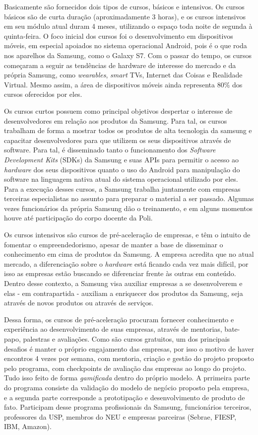 Basicamente são fornecidos dois tipos de cursos, básicos e intensivos. Os cursos básicos são de curta duração (aproximadamente 3 horas), e os cursos intensivos em seu módulo atual duram 4 meses, utilizando o espaço toda noite de segunda à quinta-feira. O foco inicial dos cursos foi o desenvolvimento em dispositivos móveis, em especial apoiados no sistema operacional Android, pois é o que roda nos aparelhos da Samsung, como o Galaxy S7. Com o passar do tempo, os cursos começaram a seguir as tendências de hardware de interesse do mercado e da própria Samsung, como \textit{wearables}, \textit{smart} TVs, Internet das Coisas e Realidade Virtual. Mesmo assim, a área de dispositivos móveis ainda representa 80\% dos cursos oferecidos por eles.

Os cursos curtos possuem como principal objetivos despertar o interesse de desenvolvedores em relação aos produtos da Samsung. Para tal, os cursos trabalham de forma a mostrar todos os produtos de alta tecnologia da samsung e capacitar desenvolvedores para que utilizem os seus dispositivos através de software. Para tal, é disseminado tanto o funcionamento dos \textit{Software Development Kits} (SDKs) da Samsung e suas APIs para permitir o acesso ao \textit{hardware} dos seus dispositivos quanto o uso do Android para manipulação do software na linguagem nativa atual do sistema operacional utilizado por eles. Para a execução desses cursos, a Samsung trabalha juntamente com empresas terceiras especialistas no assunto para preparar o material a ser passado. Algumas vezes funcionários da própria Samsung dão o treinamento, e em alguns momentos houve até participação do corpo docente da Poli.

Os cursos intensivos são cursos de pré-aceleração de empresas, e têm o intuito de fomentar o empreendedorismo, apesar de manter a base de disseminar o conhecimento em cima de produtos da Samsung. A empresa acredita que no atual mercado, a diferenciação sobre o \textit{hardware} está ficando cada vez mais difícil, por isso as empresas estão buscando se diferenciar frente às outras em conteúdo. Dentro desse contexto, a Samsung visa auxiliar empresas a se desenvolverem e elas - em contrapartida - auxiliam a enriquecer dos produtos da Samsung, seja através de novos produtos ou através de serviços.

Dessa forma, os cursos de pré-aceleração procuram fornecer conhecimento e experiência ao desenvolvimento de suas empresas, através de mentorias, bate-papo, palestras e avaliações. Como são cursos gratuitos, um dos principais desafios é manter o próprio engajamento das empresas, por isso o motivo de haver encontros 4 vezes por semana, com mentoria, criação e gestão do projeto proposto pelo programa, com checkpoints de avaliação das empresas ao longo do projeto. Tudo isso feito de forma \textit{gamificada} dentro do próprio modelo. A prrimeira parte do programa consiste da validação do modelo de negócio proposto pela empresa, e a segunda parte corresponde a prototipação e desenvolvimento de produto de fato. Participam desse programa profissionais da Samsung, funcionários terceiros, professores da USP, membros do NEU e empresas parceiras (Sebrae, FIESP, IBM, Amazon).


